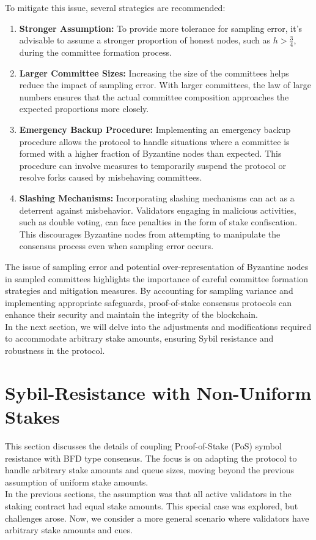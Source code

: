 To mitigate this issue, several strategies are recommended:\\
\begin{enumerate}
    \item \textbf{Stronger Assumption:} To provide more tolerance for sampling error, it's advisable to assume a stronger proportion of honest nodes, such as \(h > \frac{3}{4}\), during the committee formation process.
    \item \textbf{Larger Committee Sizes:} Increasing the size of the committees helps reduce the impact of sampling error. With larger committees, the law of large numbers ensures that the actual committee composition approaches the expected proportions more closely.
    \item \textbf{Emergency Backup Procedure:} Implementing an emergency backup procedure allows the protocol to handle situations where a committee is formed with a higher fraction of Byzantine nodes than expected. This procedure can involve measures to temporarily suspend the protocol or resolve forks caused by misbehaving committees.
    \item \textbf{Slashing Mechanisms:} Incorporating slashing mechanisms can act as a deterrent against misbehavior. Validators engaging in malicious activities, such as double voting, can face penalties in the form of stake confiscation. This discourages Byzantine nodes from attempting to manipulate the consensus process even when sampling error occurs.
\end{enumerate}
The issue of sampling error and potential over-representation of Byzantine nodes in sampled committees highlights the importance of careful committee formation strategies and mitigation measures. By accounting for sampling variance and implementing appropriate safeguards, proof-of-stake consensus protocols can enhance their security and maintain the integrity of the blockchain.\\
In the next section, we will delve into the adjustments and modifications required to accommodate arbitrary stake amounts, ensuring Sybil resistance and robustness in the protocol.
\section{Sybil-Resistance with Non-Uniform Stakes}
This section discusses the details of coupling Proof-of-Stake (PoS) symbol resistance with BFD type consensus. The focus is on adapting the protocol to handle arbitrary stake amounts and queue sizes, moving beyond the previous assumption of uniform stake amounts.\\
In the previous sections, the assumption was that all active validators in the staking contract had equal stake amounts. This special case was explored, but challenges arose. Now, we consider a more general scenario where validators have arbitrary stake amounts and cues.
